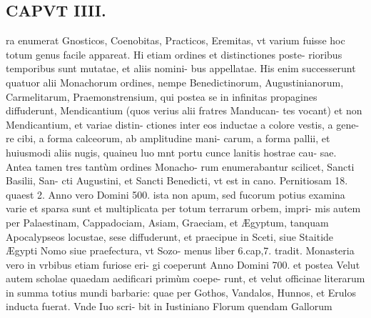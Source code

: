 \documentclass{article}
\begin{document}
\begin{pages}
\section*{CAPVT  IIII. }
\marginpar{[ p.219 ]}\pstart ra enumerat Gnosticos, Coenobitas, Practicos, Eremitas, vt varium fuisse hoc totum genus facile appareat. Hi etiam ordines et distinctiones poste- rioribus temporibus sunt mutatae, et aliis nomini- bus appellatae. His enim successerunt quatuor alii Monachorum ordines, nempe Benedictinorum, Augustinianorum, Carmelitarum, Praemonstrensium, qui postea se in infinitas propagines diffuderunt, Mendicantium (quos verius alii fratres Manducan- tes vocant) et non Mendicantium, et variae distin- ctiones inter eos inductae a colore vestis, a gene- re cibi, a forma calceorum, ab amplitudine mani- carum, a forma pallii, et huiusmodi aliis nugis, quaineu luo mnt portu cunce lanitis hostrae cau- sae. Antea tamen tres tantùm ordines Monacho- rum enumerabantur scilicet, Sancti Basilii, San- cti Augustini, et Sancti Benedicti, vt est in cano. Pernitiosam 18. quaest 2.  \pend\pstart Anno vero Domini 500. ista non apum, sed fucorum potius examina varie et sparsa sunt et multiplicata per totum terrarum orbem, impri- mis autem per Palaestinam, Cappadociam, Asiam, Graeciam, et Ægyptum, tanquam Apocalypseos locustae, sese diffuderunt, et praecipue in Sceti, siue Staitide Ægypti Nomo siue praefectura, vt Sozo- menus liber 6.cap,7. tradit.  \pend\pstart Monasteria vero in vrbibus etiam furiose eri- gi coeperunt Anno Domini 700. et postea Velut autem scholae quaedam aedificari primùm coepe- runt, et velut officinae literarum in summa totius mundi barbarie: quae per Gothos, Vandalos, Hunnos, et Erulos inducta fuerat. Vnde Iuo scri- bit in Iustiniano Florum quendam Gallorum  \pend

\end{pages}
\end{document}
